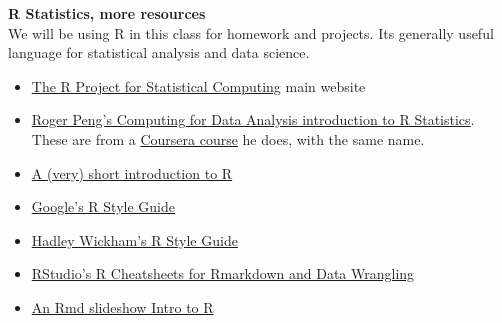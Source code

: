 \documentclass[10pt]{article} %
\begin{document}
  {\bf R Statistics, more resources} \\
      We will be using R in this class for homework and projects.
      Its generally useful language for statistical analysis and data science.
    \begin{itemize}
    	\item \href{"http://www.r-project.org/index.html"}{The R Project for Statistical Computing}  \cite{r_r_2014} main website
    	\item \href{"https://www.youtube.com/user/rdpeng/playlists"}{Roger Peng's Computing for Data Analysis introduction to R Statistics}. These are from a \href{"https://www.coursera.org/course/compdata"} {Coursera course} he does, with the same name. \cite{peng_computing_2014}
      \item \href{"http://cran.r-project.org/doc/contrib/Torfs+Brauer-Short-R-Intro.pdf"}{A (very) short introduction to R}  \cite{torfs_very_2014}
    	\item \href{"https://google-styleguide.googlecode.com/svn/trunk/Rguide.xml"}{ Google's R Style Guide}
    	\item \href{"http://stat405.had.co.nz/r-style.html"}{ Hadley Wickham's R Style Guide}
    	\item \href{"http://www.Rstudio.com/resources/cheatsheets/"}{ RStudio's R Cheatsheets for Rmarkdown and Data Wrangling}
    	\item \href{"http://www.theresearchkitchen.com/blog"}{An Rmd slideshow Intro to R}
    \end{itemize}
\end{document}
